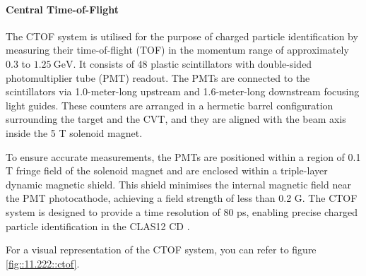 \paragraph{Central Time-of-Flight}
    The CTOF system is utilised for the purpose of charged particle identification by measuring their time-of-flight (TOF) in the momentum range of approximately $0.3$ to $1.25 ~\text{GeV}$.
    It consists of 48 plastic scintillators with double-sided photomultiplier tube (PMT) readout.
    The PMTs are connected to the scintillators via 1.0-meter-long upstream and 1.6-meter-long downstream focusing light guides.
    These counters are arranged in a hermetic barrel configuration surrounding the target and the CVT, and they are aligned with the beam axis inside the 5 T solenoid magnet.

    To ensure accurate measurements, the PMTs are positioned within a region of 0.1 T fringe field of the solenoid magnet and are enclosed within a triple-layer dynamic magnetic shield.
    This shield minimises the internal magnetic field near the PMT photocathode, achieving a field strength of less than 0.2 G.
    The CTOF system is designed to provide a time resolution of 80 ps, enabling precise charged particle identification in the CLAS12 CD \cite{carman2020ctof}.

    For a visual representation of the CTOF system, you can refer to figure \ref{fig::11.222::ctof}.
